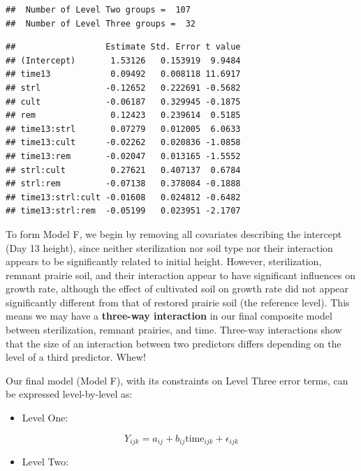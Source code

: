 \documentclass[
]{krantz}
\providecommand{\tightlist}{%
  \setlength{\itemsep}{0pt}\setlength{\parskip}{0pt}}
\begin{document}
\begin{verbatim}
##  Number of Level Two groups =  107 
##  Number of Level Three groups =  32
\end{verbatim}

\begin{verbatim}
##                  Estimate Std. Error t value
## (Intercept)       1.53126   0.153919  9.9484
## time13            0.09492   0.008118 11.6917
## strl             -0.12652   0.222691 -0.5682
## cult             -0.06187   0.329945 -0.1875
## rem               0.12423   0.239614  0.5185
## time13:strl       0.07279   0.012005  6.0633
## time13:cult      -0.02262   0.020836 -1.0858
## time13:rem       -0.02047   0.013165 -1.5552
## strl:cult         0.27621   0.407137  0.6784
## strl:rem         -0.07138   0.378084 -0.1888
## time13:strl:cult -0.01608   0.024812 -0.6482
## time13:strl:rem  -0.05199   0.023951 -2.1707
\end{verbatim}

To form Model F, we begin by removing all covariates describing the intercept (Day 13 height), since neither sterilization nor soil type nor their interaction appears to be significantly related to initial height. However, sterilization, remnant prairie soil, and their interaction appear to have significant influences on growth rate, although the effect of cultivated soil on growth rate did not appear significantly different from that of restored prairie soil (the reference level). This means we may have a \textbf{three-way interaction}  in our final composite model between sterilization, remnant prairies, and time. Three-way interactions show that the size of an interaction between two predictors differs depending on the level of a third predictor. Whew!

Our final model (Model F), with its constraints on Level Three error terms, can be expressed level-by-level as:

\begin{itemize}
\tightlist
\item
  Level One:
\end{itemize}

\begin{equation*}
Y_{ijk} = a_{ij}+b_{ij}\textrm{time}_{ijk}+\epsilon_{ijk}
\end{equation*}

\begin{itemize}
\tightlist
\item
  Level Two:
\end{itemize}
\end{document}
